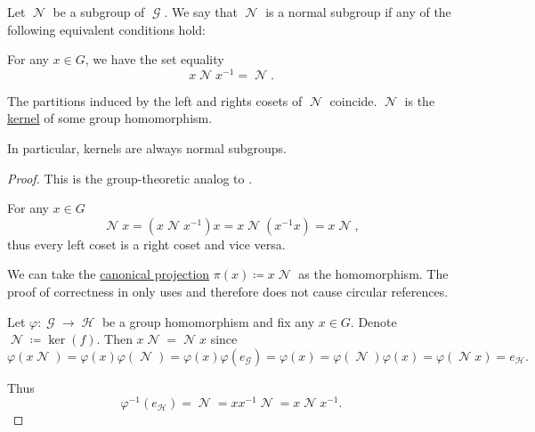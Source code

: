 \begin{definition}\label{def:normal_subgroup}
  Let \( \mscrN \) be a subgroup of \( \mscrG \). We say that \( \mscrN \) is a normal subgroup if any of the following equivalent conditions hold:
  \begin{thmenum}
     For any \( x \in G \), we have the set equality
    \begin{equation}\label{eq:def:normal_subgroup/direct}
      x \mscrN x^{-1} = \mscrN.
    \end{equation}

     The partitions induced by the left and rights cosets of \( \mscrN \) coincide.
     \( \mscrN \) is the \hyperref[def:unital_magma_kernel]{kernel} of some group homomorphism.
  \end{thmenum}

  In particular, kernels are always normal subgroups.
\end{definition}
\begin{proof}
  This is the group-theoretic analog to .

   For any \( x \in G \)
  \begin{equation*}
    \mscrN x = (x \mscrN x^{-1})x = x \mscrN(x^{-1}x) = x \mscrN,
  \end{equation*}
  thus every left coset is a right coset and vice versa.

   We can take the \hyperref[def:quotient_group]{canonical projection} \( \pi(x) \coloneqq x \mscrN \) as the homomorphism. The proof of correctness in  only uses  and therefore does not cause circular references.

   Let \( \varphi: \mscrG \to \mscrH \) be a group homomorphism and fix any \( x \in G \). Denote \( \mscrN \coloneqq \ker(f) \). Then \( x \mscrN = \mscrN x \) since
  \begin{equation*}
    \varphi(x \mscrN)
    =
    \varphi(x) \varphi(\mscrN)
    =
    \varphi(x) \varphi(e_{\mscrG})
    =
    \varphi(x)
    =
    \varphi(\mscrN) \varphi(x)
    =
    \varphi(\mscrN x)
    =
    e_{\mscrH}.
  \end{equation*}

  Thus
  \begin{equation*}
    \varphi^{-1}(e_{\mscrH}) = \mscrN = xx^{-1}\mscrN = x \mscrN x^{-1}.
  \end{equation*}
\end{proof}

